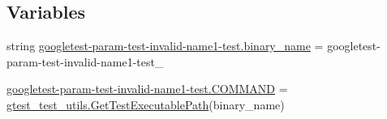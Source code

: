 \subsection*{Variables}
\begin{DoxyCompactItemize}
\item 
string \mbox{\hyperlink{namespacegoogletest-param-test-invalid-name1-test_a073018906c94da733e54cf4c457bec29}{googletest-\/param-\/test-\/invalid-\/name1-\/test.\+binary\+\_\+name}} = \textquotesingle{}googletest-\/param-\/test-\/invalid-\/name1-\/test\+\_\+\textquotesingle{}
\item 
\mbox{\hyperlink{namespacegoogletest-param-test-invalid-name1-test_a92131bc06f98ffc4aa4a6effd87da6fd}{googletest-\/param-\/test-\/invalid-\/name1-\/test.\+C\+O\+M\+M\+A\+ND}} = \mbox{\hyperlink{namespacegtest__test__utils_a89ed3717984a80ffbb7a9c92f71b86a2}{gtest\+\_\+test\+\_\+utils.\+Get\+Test\+Executable\+Path}}(binary\+\_\+name)
\end{DoxyCompactItemize}
